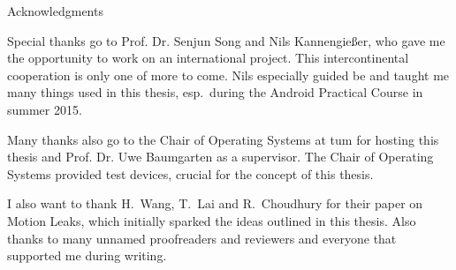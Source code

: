 \thispagestyle{empty}

\vspace*{2cm}

\begin{center}
{ Acknowledgments}
\end{center}

\vspace{1cm}

Special thanks go to Prof. Dr. Senjun Song and Nils Kannengießer, who gave me the opportunity to work on an international project. This intercontinental cooperation is only one of more to come. Nils especially guided be and taught me many things used in this thesis, esp.\ during the Android Practical Course in summer 2015.

Many thanks also go to the Chair of Operating Systems at \gls{tum} for hosting this thesis and Prof. Dr. Uwe Baumgarten as a supervisor. The Chair of Operating Systems provided test devices, crucial for the concept of this thesis.

I also want to thank H.\ Wang, T.\ Lai and R.\ Choudhury for their paper on Motion Leaks\cite{wang2015mole}, which initially sparked the ideas outlined in this thesis. Also thanks to many unnamed proofreaders and reviewers and everyone that supported me during writing.

\cleardoublepage{}
